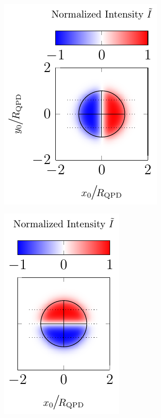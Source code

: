  \begin{figure}
  \centering
  \begin{subfigure}[b]{0.36\textwidth}
    \centering
    \includegraphics[]{Plots/cache/QPDx.pdf}
    \label{fig:TO-QPDx}
  \end{subfigure}
  \hfill
  \begin{subfigure}[b]{0.3\textwidth}
    \centering
    \includegraphics[]{Plots/cache/QPDy.pdf}

\end{subfigure}
\end{figure}
